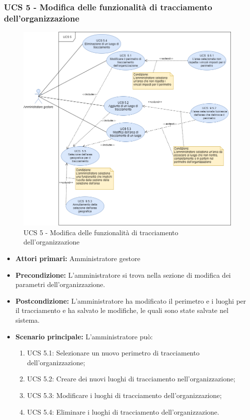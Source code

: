\subsubsection{UCS 5 - Modifica delle funzionalità di tracciamento dell'organizzazione}%
\begin{figure}[h]
	\centering
    \includegraphics[scale=0.53]{sezioni/UseCase/Immagini/UCS5.png}
    \caption{UCS 5 - Modifica delle funzionalità di tracciamento dell'organizzazione}
\end{figure}
\begin{itemize}
    \item \textbf{Attori primari:} Amministratore gestore
    \item \textbf{Precondizione:} L'amministratore si trova nella sezione di modifica dei parametri dell'organizzazione.
    \item \textbf{Postcondizione:} L'amministratore ha modificato il perimetro e i luoghi per il tracciamento e ha salvato le modifiche, le quali sono state salvate nel sistema.
    \item \textbf{Scenario principale:} L'amministratore può:
    \begin{enumerate}
        \item UCS 5.1: Selezionare un nuovo perimetro di tracciamento dell'organizzazione;
        \item UCS 5.2: Creare dei nuovi luoghi di tracciamento nell'organizzazione;
        \item UCS 5.3: Modificare i luoghi di tracciamento dell'organizzazione;
        \item UCS 5.4: Eliminare i luoghi di tracciamento dell'organizzazione.
    \end{enumerate}
\end{itemize}

